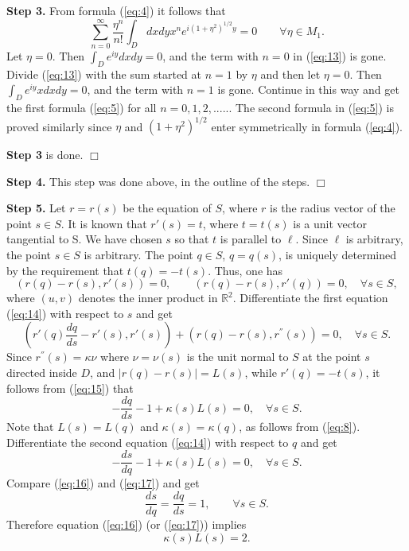 \documentclass[final,11pt]{article}
\begin{document}
{\bf Step 3.} From formula (\ref{eq:4}) it follows that
\begin{equation}\label{eq:13}
\sum_{n=0}^\infty \frac {\eta^n}{n!}\int_Ddxdy x^n e^{i(1+\eta^2)^{1/2}y}=0 \qquad \forall \eta\in M_1.
\end{equation}
Let $\eta=0$. Then $\int_D e^{iy}dxdy=0$, and the term with $n=0$ in  (\ref{eq:13}) is gone.
Divide  (\ref{eq:13}) with the sum started at $n=1$ by $\eta$ and then let $\eta=0$.
Then  $\int_D e^{iy}xdxdy=0$, and the term with $n=1$ is gone. Continue in this way and
get the first formula (\ref{eq:5}) for all $n=0,1,2,.....$. The second formula in  (\ref{eq:5})
is proved similarly since $\eta$ and $(1+\eta^2)^{1/2}$ enter symmetrically in formula  (\ref{eq:4}).

{\bf Step 3} is done. \hfill $\Box$

{\bf Step 4.} This step was done above, in the outline of the steps. \hfill $\Box$

{\bf Step 5.}  Let $r=r(s)$ be the equation of $S$, where $r$ is the radius vector of the point $s\in S$.
It is known that $r'(s)=t$, where $t=t(s)$ is a unit vector tangential to S. We have chosen $s$ so that $t$
is parallel to $\ell$. Since $\ell$ is arbitrary, the point $s\in S$ is arbitrary.
The point $q\in S$, $q=q(s)$,  is uniquely determined by the requirement that
$t(q)=-t(s)$. Thus,  one has
\begin{equation}\label{eq:14}
(r(q)-r(s), r'(s))=0,\qquad (r(q)-r(s), r'(q))=0, \quad \forall s\in S,
\end{equation}
where $(u,v)$ denotes the inner product in $\mathbb {R}^2$.
Differentiate the first equation  (\ref{eq:14}) with respect to $s$
and get
\begin{equation}\label{eq:15}
(r'(q)\frac{dq}{ds}-r'(s), r'(s))+(r(q)-r(s), r^{''}(s)) =0, \quad \forall s\in S.
\end{equation}
Since $ r^{''}(s)=\kappa \nu$ where $\nu=\nu(s)$ is the unit normal to $S$ at the point $s$
directed inside $D$, and $|r(q)-r(s)|=L(s)$, while $r'(q)=-t(s)$, it follows from  (\ref{eq:15}) that
\begin{equation}\label{eq:16}
-\frac{dq}{ds}-1+\kappa(s)L(s) =0, \quad \forall s\in S.
\end{equation}
Note that $L(s)=L(q)$ and $\kappa(s)=\kappa(q)$, as follows from (\ref{eq:8}).
Differentiate the second equation  (\ref{eq:14}) with respect to $q$ and get
 \begin{equation}\label{eq:17}
-\frac{ds}{dq}-1+\kappa(s)L(s) =0, \quad \forall s\in S.
\end{equation}
Compare   (\ref{eq:16}) and  (\ref{eq:17}) and get
\begin{equation}\label{eq:18}
\frac{ds}{dq}=\frac{dq}{ds}=1, \qquad \forall s\in S.
\end{equation}
Therefore equation  (\ref{eq:16}) (or (\ref{eq:17})) implies
\begin{equation}\label{eq:19}
\kappa (s)L(s)=2.
\end{equation}
\end{document}
